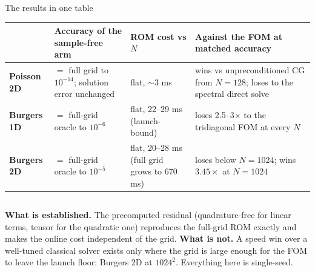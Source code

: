 \documentclass[10pt,aspectratio=169]{beamer}
\begin{document}
\begin{frame}{The results in one table}
  \centering\small
  \begin{tabular}{@{}lp{}p{}p{}@{}}
    \toprule
    & \textbf{Accuracy of the sample-free arm} & \textbf{ROM cost vs $N$} & \textbf{Against the FOM at matched accuracy}\\
    \midrule
    \textbf{Poisson 2D} & $=$ full grid to $10^{-14}$; solution error unchanged & flat, $\sim 3$ ms & wins vs unpreconditioned CG from $N=128$; loses to the spectral direct solve\\
    \addlinespace
    \textbf{Burgers 1D} & $=$ full-grid oracle to $10^{-6}$ & flat, 22--29 ms (launch-bound) & loses 2.5--3$\times$ to the tridiagonal FOM at every $N$\\
    \addlinespace
    \textbf{Burgers 2D} & $=$ full-grid oracle to $10^{-5}$ & flat, 20--28 ms (full grid grows to 670 ms) & loses below $N=1024$; wins $3.45\times$ at $N=1024$\\
    \bottomrule
  \end{tabular}

  \vspace{4mm}
  \begin{columns}[T]
    \small
    \textbf{What is established.} The precomputed residual (quadrature-free for linear terms, tensor for the quadratic one) reproduces the full-grid ROM exactly and makes the online cost independent of the grid.
    \small
    \textbf{What is not.} A speed win over a well-tuned classical solver exists only where the grid is large enough for the FOM to leave the launch floor: Burgers 2D at $1024^2$. Everything here is single-seed.
  \end{columns}
\end{frame}
\end{document}
